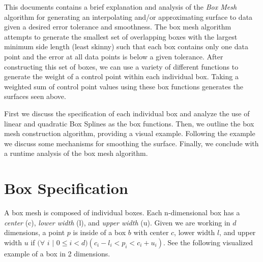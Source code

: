 \documentclass[11pt,margin=1in]{article}
\begin{document}
This documents contains a brief explanation and analysis of the
\textit{Box Mesh} algorithm for generating an interpolating and/or
approximating surface to data given a desired error tolerance and
smoothness. The box mesh algorithm attempts to generate the smallest
set of overlapping boxes with the largest minimum side length (least
skinny) such that each box contains only one data point and the error
at all data points is below a given tolerance. After constructing this
set of boxes, we can use a variety of different functions to generate
the weight of a control point within each individual box. Taking a
weighted sum of control point values using these box functions
generates the surfaces seen above.

First we discuss the specification of each individual box and analyze
the use of linear and quadratic Box Splines as the box functions.
Then, we outline the box mesh construction algorithm, providing a
visual example. Following the example we discuss some mechanisms for
smoothing the surface. Finally, we conclude with a runtime analysis of
the box mesh algorithm.

\section{Box Specification}

A box mesh is composed of individual boxes. Each n-dimensional box has
a \textit{center} (c), \textit{lower width} (l), and \textit{upper
  width} (u). Given we are working in $d$ dimensions, a point $p$ is
inside of a box $b$ with center $c$, lower width $l$, and upper width
$u$ if $(\forall$ $i$ $|$ $0 \leq i < d)(c_i-l_i < p_i < c_i+u_i)$.
See the following visualized example of a box in 2 dimensions.

\vspace{3mm}

\begin{center}
\end{center}
\end{document}
